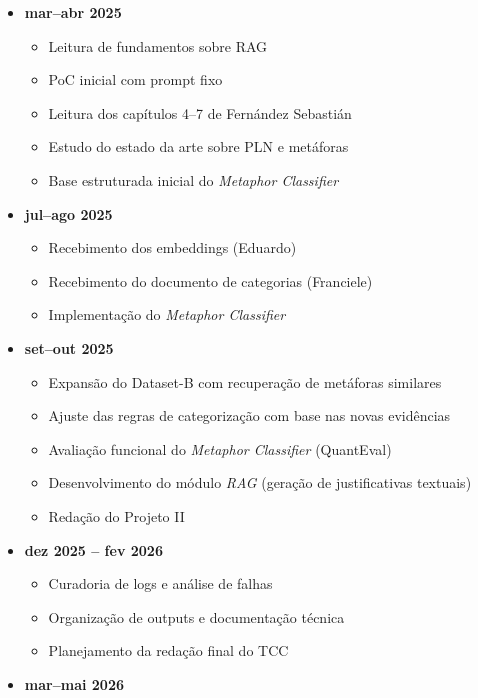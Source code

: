 \begin{itemize}
\tightlist
\item
  \textbf{mar--abr 2025}

  \begin{itemize}
  \tightlist
  \item
    Leitura de fundamentos sobre RAG
  \item
    PoC inicial com prompt fixo
  \item
    Leitura dos capítulos 4--7 de Fernández Sebastián
  \item
    Estudo do estado da arte sobre PLN e metáforas
  \item
    Base estruturada inicial do \emph{Metaphor Classifier}
  \end{itemize}
\item
  \textbf{jul--ago 2025}

  \begin{itemize}
  \tightlist
  \item
    Recebimento dos embeddings (Eduardo)
  \item
    Recebimento do documento de categorias (Franciele)
  \item
    Implementação do \emph{Metaphor Classifier}
  \end{itemize}
\item
  \textbf{set--out 2025}

  \begin{itemize}
  \tightlist
  \item
    Expansão do Dataset-B com recuperação de metáforas similares
  \item
    Ajuste das regras de categorização com base nas novas evidências
  \item
    Avaliação funcional do \emph{Metaphor Classifier} (QuantEval)
  \item
    Desenvolvimento do módulo \emph{RAG} (geração de justificativas
    textuais)
  \item
    Redação do Projeto II
  \end{itemize}
\item
  \textbf{dez 2025 -- fev 2026}

  \begin{itemize}
  \tightlist
  \item
    Curadoria de logs e análise de falhas
  \item
    Organização de outputs e documentação técnica
  \item
    Planejamento da redação final do TCC
  \end{itemize}
\item
  \textbf{mar--mai 2026}


\end{itemize}
